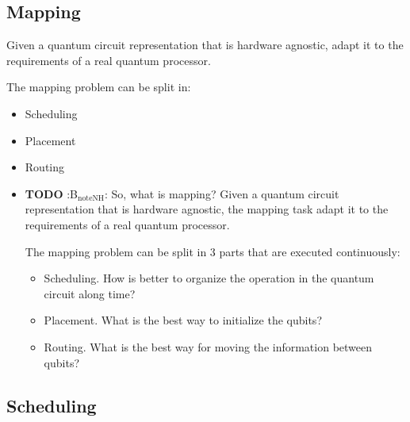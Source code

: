 \subsection*{Mapping}
\label{sec:org442a980}

Given a quantum circuit representation that is hardware agnostic, adapt it to the requirements of a real quantum processor.


The mapping problem can be split in:

\begin{itemize}
\item Scheduling
\item Placement
\item Routing
\end{itemize}

\begin{itemize}
\item {\bfseries\sffamily TODO} :B\(_{\text{noteNH}}\):
\label{sec:org9fdccaf}
So, what is mapping?
Given a quantum circuit representation that is hardware agnostic, the mapping task adapt it to the requirements of a real quantum processor.

The mapping problem can be split in 3 parts that are executed continuously:

\begin{itemize}
\item Scheduling. How is better to organize the operation in the quantum circuit along time?
\item Placement. What is the best way to initialize the qubits?
\item Routing. What is the best way for moving the information between qubits?
\end{itemize}
\end{itemize}

\subsection*{Scheduling}
\label{sec:org6ac5adb}

